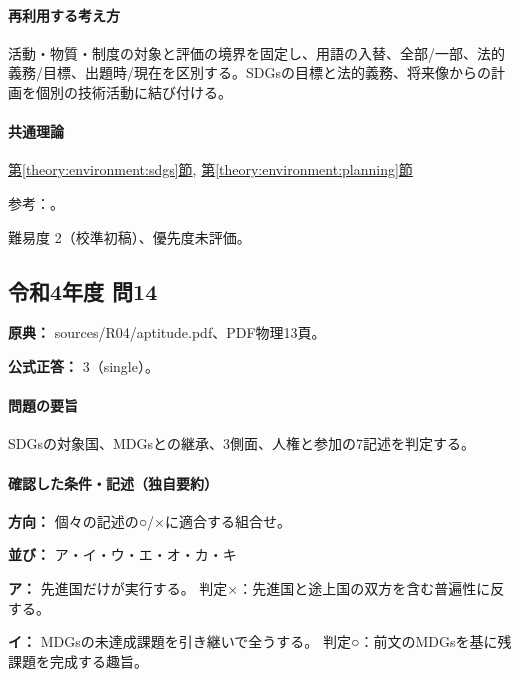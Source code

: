 \paragraph{再利用する考え方} 活動・物質・制度の対象と評価の境界を固定し、用語の入替、全部/一部、法的義務/目標、出題時/現在を区別する。SDGsの目標と法的義務、将来像からの計画を個別の技術活動に結び付ける。

\paragraph{共通理論} \hyperref[theory:environment:sdgs]{第\ref*{theory:environment:sdgs}節}, \hyperref[theory:environment:planning]{第\ref*{theory:environment:planning}節}

\par 参考：\cite{env_sdgs_agenda,env_sdgs_binding,env_sdgs2016}。

\par 難易度 2（校準初稿）、優先度未評価。

\subsection{令和4年度 問14}
\label{q:r04-reg-apt-14}

\noindent\textbf{原典：} sources/R04/aptitude.pdf、PDF物理13頁。

\textbf{公式正答：} 3（single）。

\paragraph{問題の要旨} SDGsの対象国、MDGsとの継承、3側面、人権と参加の7記述を判定する。

\paragraph{確認した条件・記述（独自要約）}\mbox{}\par

\noindent\textbf{方向：} 個々の記述の○/×に適合する組合せ。\par

\noindent\textbf{並び：} ア・イ・ウ・エ・オ・カ・キ\par

\noindent\textbf{ア：} 先進国だけが実行する。 判定×：先進国と途上国の双方を含む普遍性に反する。\par

\noindent\textbf{イ：} MDGsの未達成課題を引き継いで全うする。 判定○：前文のMDGsを基に残課題を完成する趣旨。\par

